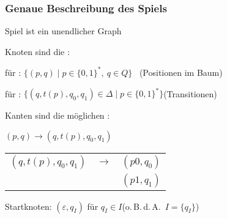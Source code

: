 \begin{frame}
  \frametitle{Genaue Beschreibung des Spiels }

  Spiel ist ein unendlicher Graph
  \begin{Itemize}
    \item<+->
      Knoten sind die :
      \begin{Itemize}
        \item
          für \AUT: $\{(p,q) \mid p \in \{0,1\}^*,~ q \in Q\}$~ (Positionen im Baum)
        \item
          für \PF: $\{(q,t(p),q_0,q_1) \in \Delta \mid p \in \{0,1\}^*\}$\quad (Transitionen)
      \end{Itemize}
      \par\smallskip
    \item<+->
      Kanten sind die möglichen :
      \begin{Itemize}
        \item
          $(p,q) \to (q,t(p),q_0,q_1)$
        \item
          \begin{tabular}[t]{@{}l@{~}c@{~}l@{}}
            $(q,t(p),q_0,q_1)$ & $\to$ & $(p0,q_0)$ \\
                               & \hspace*{-12pt}\raisebox{4pt}{\turnbox{-25}{$\to$}} & $(p1,q_1)$
          \end{tabular}
      \end{Itemize}
      \par\smallskip
    \item<+->
      Startknoten: $(\varepsilon,q_I)$ für $q_I \in I$\quad (o.\,B.\,d.\,A.\ $I=\{q_I\}$)
  \end{Itemize}

  \par\bigskip

  \par\bigskip

\end{frame}

